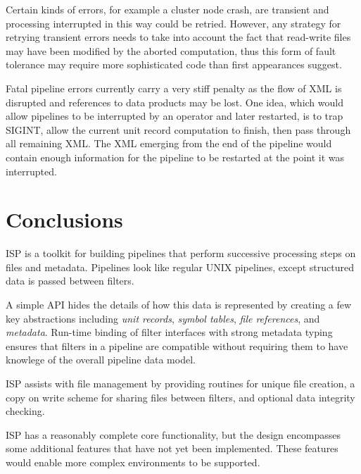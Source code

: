 \documentclass{article}
\begin{document}
Certain kinds of errors, for example a cluster node crash, are transient 
and processing interrupted in this way could be retried.  However, any 
strategy for retrying transient errors needs to take into account the fact 
that read-write files may have been modified by the aborted computation, thus
this form of fault tolerance may require more sophisticated code than
first appearances suggest.

Fatal pipeline errors currently carry a very stiff penalty as the flow
of XML is disrupted and references to data products may be lost.  
One idea, which would allow pipelines to be interrupted
by an operator and later restarted, is to trap SIGINT, allow the current
unit record computation to finish, then pass through all remaining XML.
The XML emerging from the end of the pipeline would contain enough information
for the pipeline to be restarted at the point it was interrupted.

\section{Conclusions}\label{secconclusions}

ISP is a toolkit for building pipelines that perform successive
processing steps on files and metadata.  Pipelines look like regular
UNIX pipelines, except structured data is passed between filters.  

A simple API hides the details of how this data is represented by 
creating a few key abstractions including {\em unit records}, 
{\em symbol tables}, {\em file references}, and {\em metadata}.  
Run-time binding of filter interfaces with strong metadata typing ensures 
that filters in a pipeline are compatible without requiring them to 
have knowlege of the overall pipeline data model.

ISP assists with file management by providing routines for unique file 
creation, a copy on write scheme for sharing files between filters, and
optional data integrity checking.

ISP has a reasonably complete core functionality, but the design encompasses
some additional features that have not yet been implemented.  These features
would enable more complex environments to be supported.



\end{document}
